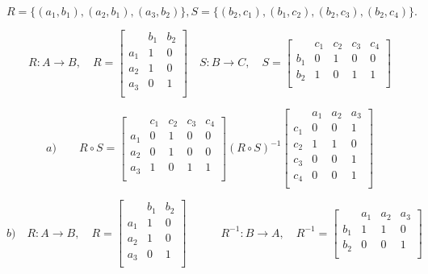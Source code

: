 \begin{center}\large{}\end{center}

$$
R = \{(a_1, b_1), (a_2, b_1), (a_3, b_2)\}, S = \{(b_2, c_1), (b_1, c_2), (b_2, c_3), (b_2, c_4)\}.
$$

$$
R: A \to B,  \quad  R = \left[ \begin{array}{c|ccc}
  & b_1 & b_2 \\
  \hline
  a_1 & 1 & 0 \\
  a_2 & 1 & 0 \\
  a_3 & 0 & 1 \\
  \end{array} \right] \quad
S: B \to C, \quad S=   \left[ \begin{array}{c|cccc}
  & c_1 & c_2 & c_3 & c_4  \\
  \hline
  b_1 & 0 & 1 & 0 & 0 \\
  b_2 & 1 & 0 & 1 & 1 \\
  \end{array} \right]
$$

$$
a) \qquad
R \circ S = \left[ \begin{array}{c|cccc}
  & c_1 & c_2 & c_3 & c_4  \\
  \hline
  a_1 & 0 & 1 & 0 & 0 \\
  a_2 & 0 & 1 & 0 & 0 \\
  a_3 & 1 & 0 & 1 & 1 \\
\end{array} \right]
  (R \circ S)^{-1} \left[ \begin{array}{c|ccc}
 & a_1 & a_2 & a_3 \\
 \hline
 c_1 & 0 & 0 & 1 \\
 c_2 & 1 & 1 & 0 \\
 c_3 & 0 & 0 & 1 \\
 c_4 & 0 & 0 & 1\\
\end{array} \right]
$$

$$
b) \quad R: A \to B,  \quad  R = \left[ \begin{array}{c|ccc}
  & b_1 & b_2 \\
  \hline
  a_1 & 1 & 0 \\
  a_2 & 1 & 0 \\
  a_3 & 0 & 1 \\
  \end{array} \right] \quad \qquad R^{-1}: B \to A,  \quad  R^{-1} = \left[ \begin{array}{c|ccc}
  & a_1 & a_2 & a_3 \\
  \hline
  b_1 & 1 & 1 & 0 \\
  b_2 & 0 & 0 & 1 \\
  \end{array} \right]
$$

